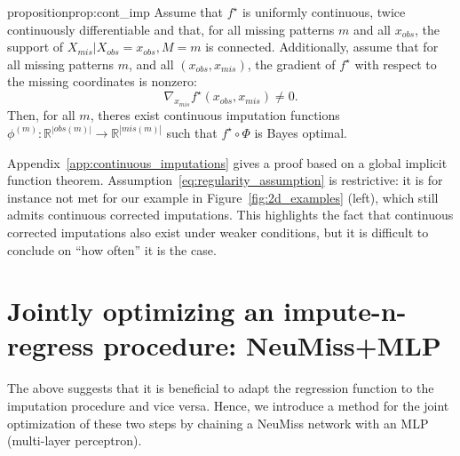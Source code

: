 \documentclass{article}
\newcommand{\RR}{\mathbb{R}}
\theoremstyle{plain}
\begin{document}
\begin{restatable}{proposition}{prop:cont_imp}
    \label{prop:cont_imp}
        Assume that $f^{\star}$ is uniformly continuous,  twice continuously differentiable and that, for all missing patterns $m$ and all $x_{obs}$, the support of $X_{mis} | X_{obs}=x_{obs}, M=m$ is connected. 
    Additionally, assume that for all missing patterns $m$, and all $(x_{obs}, x_{mis})$, the gradient of $f^{\star}$ with respect to the missing coordinates is nonzero:
    \begin{equation}
        \nabla_{x_{mis}} f^{\star} (x_{obs}, x_{mis}) \neq 0. \label{eq:regularity_assumption}
    \end{equation}
    Then, for all $m$, theres exist continuous imputation functions $\phi^{(m)} : \RR^{|obs(m)|} \to \RR^{|mis(m)|}$ such that $f^{\star} \circ \Phi$ is Bayes optimal. 
\end{restatable}

Appendix~\ref{app:continuous_imputations} gives a proof based on a global implicit function theorem. Assumption~\ref{eq:regularity_assumption} is restrictive: it is for instance not met for our example in Figure~\ref{fig:2d_examples} (left), which still admits continuous corrected imputations. This highlights the fact that continuous corrected imputations also exist under weaker conditions, but it is difficult to conclude on ``how often'' it is the case.

\section{Jointly optimizing an impute-n-regress procedure: NeuMiss+MLP}

The above suggests that it is beneficial to adapt the regression function to the imputation procedure and vice versa. Hence, we introduce a method for the joint optimization of these two steps by chaining a NeuMiss network with an MLP (multi-layer perceptron).

\end{document}
